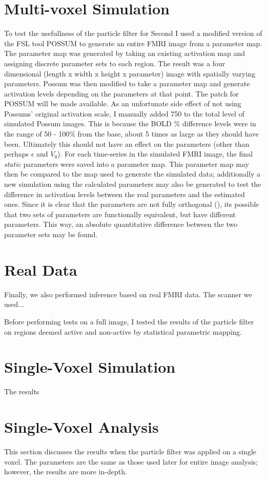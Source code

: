 \section{Multi-voxel Simulation}
To test the usefullness of the particle filter for Second I used a modified version of the FSL tool 
POSSUM to generate an entire FMRI image from a parameter map. The parameter map was generated
by taking an existing activation map and assigning discrete parameter sets to each region.
The result was a four dimensional (length x width
x height x parameter) image with spatially varying parameters. Possum was then modified
to take a parameter map and generate activation levels depending on the parameters at that
point. The patch for POSSUM will be made available. As an unfortunate side effect of 
not using Possums' original activation scale, I manually added 750 to the total level of
simulated Possum images. This is because the BOLD \% difference levels were in the range
of 50 - 100\% from the base, about 5 times as large as they should have been. Ultimately
this should not have an effect on the parameters (other than perhaps $\epsilon$ and $V_0$). 
For each time-series in the simulated FMRI image, the final \emph{static} parameters were saved
into a parameter map. This parameter map may then be compared to the map used to generate the 
simulated data; additionally a new simulation using the calculated parameters may also be 
generated to test the difference in activation levels between the real parameters and the
estimated ones. Since it is clear that the parameters are not fully orthogonal 
(\cite{Deneux2006}), its possible that two sets of parameters are functionally equivalent,
but have different parameters. This way, an absolute 
quantitative difference between the two parameter sets may be found.

\section{Real Data}
Finally, we also performed inference based on real FMRI data. The scanner we used...

Before performing tests on a full image, I tested the results of the particle filter
on regions deemed active and non-active by statistical parametric mapping. 
\section{Single-Voxel Simulation}
The results 

\section{Single-Voxel Analysis}
This section discusses the results when the particle filter was
applied on a single voxel. The parameters are the same as
those used later for entire image analysis; however, the results
are more in-depth. 

